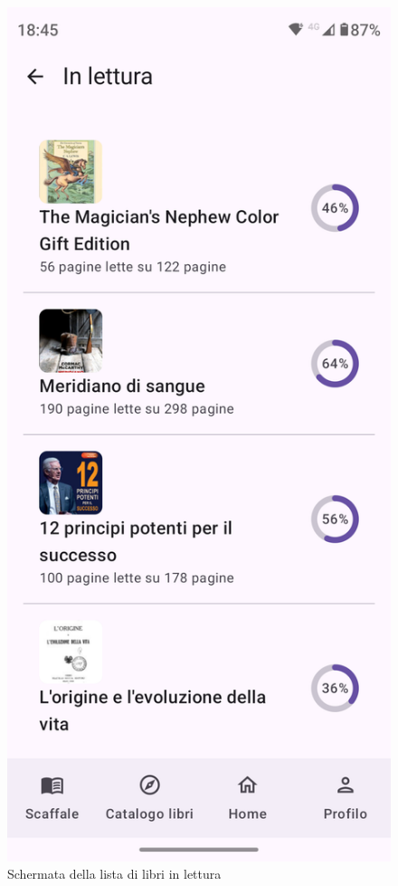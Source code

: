 \documentclass{article}
\begin{document}
\begin{figure}[H]
  \centering
  \includegraphics[width=0.6\linewidth]{reading-shelf.png}
  \caption{Schermata della lista di libri in lettura}
  \label{fig:sitemap}
\end{figure}
\end{document}
